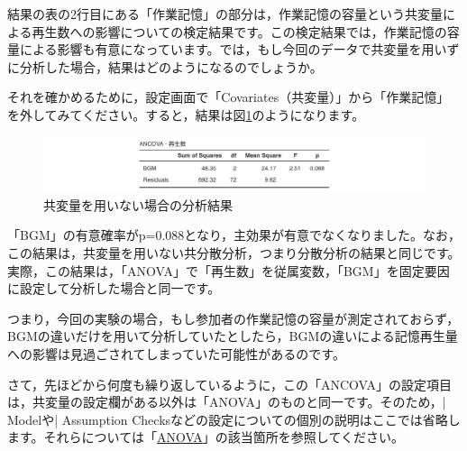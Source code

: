 \documentclass[
  12pt,
  a5jpaper,
  lualatex, ja=standard]{bxjsbook}
\begin{document}
結果の表の2行目にある「作業記憶」の部分は，作業記憶の容量という共変量による再生数への影響についての検定結果です。この検定結果では，作業記憶の容量による影響も有意になっています。では，もし今回のデータで共変量を用いずに分析した場合，結果はどのようになるのでしょうか。

それを確かめるために，設定画面で「Covariates（共変量）」から「作業記憶」を外してみてください。すると，結果は図\ref{fig:ANOVA-ancova-result2}のようになります。

\begin{figure}[!ht]

{\centering \includegraphics[width=1\linewidth]{images/ANOVA/ancova-result2} 

}

\caption{共変量を用いない場合の分析結果}\label{fig:ANOVA-ancova-result2}
\end{figure}

「BGM」の有意確率がp=0.088となり，主効果が有意でなくなりました。なお，この結果は，共変量を用いない共分散分析，つまり分散分析の結果と同じです。実際，この結果は，「ANOVA」で「再生数」を従属変数，「BGM」を固定要因に設定して分析した場合と同一です。

つまり，今回の実験の場合，もし参加者の作業記憶の容量が測定されておらず，BGMの違いだけを用いて分析していたとしたら，BGMの違いによる記憶再生量への影響は見過ごされてしまっていた可能性があるのです。

さて，先ほどから何度も繰り返しているように，この「ANCOVA」の設定項目は，共変量の設定欄がある以外は「ANOVA」のものと同一です。そのため，\colorbox{bar}{\textcolor{gmoji2}{| Model}}や\colorbox{bar}{\textcolor{gmoji2}{| Assumption Checks}}などの設定についての個別の説明はここでは省略します。それらについては「\protect\hyperlink{sec:ANOVA-anova}{ANOVA}」の該当箇所を参照してください。
\end{document}
